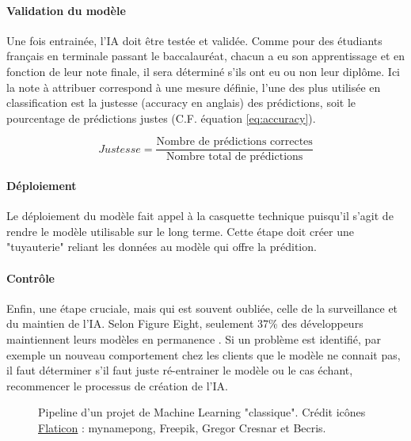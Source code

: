 \documentclass[10pt, french, a4paper]{report}
\begin{document}
\paragraph{Validation du modèle}
Une fois entrainée, l'IA doit être testée et validée. Comme pour des étudiants français en terminale passant le baccalauréat, chacun a eu son apprentissage et en fonction de leur note finale, il sera déterminé s'ils ont eu ou non leur diplôme. Ici la note à attribuer correspond à une mesure définie, l'une des plus utilisée en classification est la justesse (accuracy en anglais) des prédictions, soit le pourcentage de prédictions justes (C.F. équation \ref{eq:accuracy}).

\begin{equation}\label{eq:accuracy}
    Justesse = \frac{\text{Nombre de prédictions correctes}}{\text{Nombre total de prédictions}}
\end{equation}

\paragraph{Déploiement}
Le déploiement du modèle fait appel à la casquette technique puisqu'il s'agit de rendre le modèle utilisable sur le long terme. Cette étape doit créer une "tuyauterie" reliant les données au modèle qui offre la prédition. 

\paragraph{Contrôle}
Enfin, une étape cruciale, mais qui est souvent oubliée, celle de la surveillance et du maintien de l'IA. Selon Figure Eight, seulement 37\% des développeurs maintiennent leurs modèles en permanence \citep{figure_eight_state_2019}. Si un problème est identifié, par exemple un nouveau comportement chez les clients que le modèle ne connait pas, il faut déterminer s'il faut juste ré-entrainer le modèle ou le cas échant, recommencer le processus de création de l'IA.  

\begin{center}
\begin{figure}[hbt!]
    \caption{Pipeline d'un projet de Machine Learning "classique". Crédit icônes \href{https://www.flaticon.com/}{Flaticon} : mynamepong, Freepik, Gregor Cresnar et Becris.}
\end{figure}
\end{center}
\end{document}

